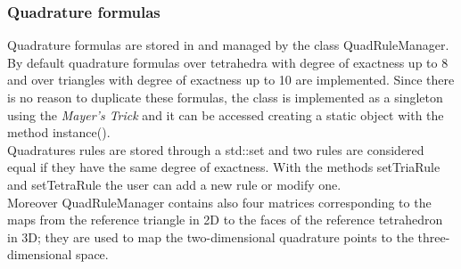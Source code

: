 \documentclass[12pt, a4paper]{article}
\newcommand{\code}[1]{{\footnotesize\ttfamily #1}}
\theoremstyle{definition}
\theoremstyle{plain}
\theoremstyle{plain}
\theoremstyle{definition}
\begin{document}
\subsubsection{Quadrature formulas}

Quadrature formulas are stored in and managed by the class \code{QuadRuleManager}. By default quadrature formulas over tetrahedra with degree of exactness up to 8 and over triangles with degree of exactness up to 10 are implemented. Since there is no reason to duplicate these formulas, the class is implemented as a singleton using the \emph{Mayer's Trick} and it can be accessed creating a static object with the method \code{instance()}.\\
Quadratures rules are stored through a \code{std::set} and two rules are considered equal if they have the same degree of exactness. With the methods \code{setTriaRule} and \code{setTetraRule} the user can add a new rule or modify one.\\
Moreover \code{QuadRuleManager} contains also four matrices corresponding to the maps from the reference triangle in 2D to the faces of the reference tetrahedron in 3D; they are used to map the two-dimensional quadrature points to the three-dimensional space.\\
\end{document}
